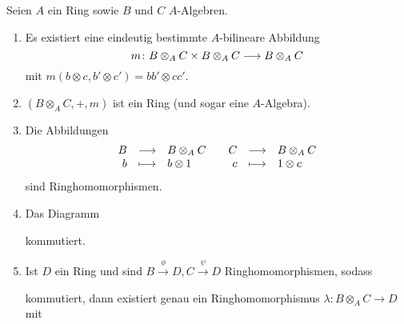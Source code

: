 \documentclass[12pt,a4paper]{scrartcl}
\theoremstyle{cplain}
\theoremstyle{cdef}
\begin{document}
\begin{satz}
	Seien $A$ ein Ring sowie $B$ und $C$ $A$-Algebren.
	\begin{enumerate}
		\item Es existiert eine eindeutig bestimmte $A$-bilineare Abbildung
		\[ m\colon B\otimes_A C\times B\otimes_A C\longrightarrow B\otimes_A C \]
		mit $m(b\otimes c, b'\otimes c') = bb'\otimes cc'$.
		\item $(B\otimes_AC, +, m)$ ist ein Ring (und sogar eine $A$-Algebra).
		\item Die Abbildungen
		\begin{align*}
			\begin{array}{rcl}
				B &\longrightarrow& B \otimes_A C \\
				b &\longmapsto& b \otimes 1
			\end{array} &&
			\begin{array}{rcl}
				C &\longrightarrow& B \otimes_A C \\
				c &\longmapsto& 1 \otimes c
			\end{array}
		\end{align*}
		sind Ringhomomorphismen.
		\item Das Diagramm
		\begin{figure}[H]
			\centering
		\end{figure}
		kommutiert.
		\item Ist $D$ ein Ring und sind $B\xrightarrow{\phi} D, C\xrightarrow{\psi}D$ Ringhomomorphismen, sodass
		\begin{figure}[H]
			\centering
		\end{figure}
		kommutiert, dann existiert genau ein Ringhomomorphismus $\lambda\colon B\otimes_AC\to D$ mit %
	\end{enumerate}
\end{satz}
\end{document}
